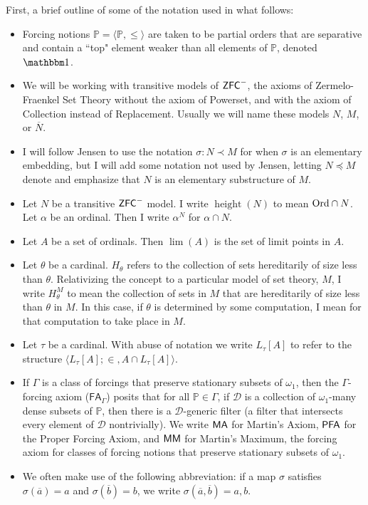 \documentclass{amsart}
\theoremstyle{definition}
\theoremstyle{remark}
\renewcommand{\P}{\mathbb{P}}
\newcommand{\N}{{\overline{N}}}
\newcommand{\PFA}{\textup{\ensuremath{\textsf{PFA}}}}
\newcommand{\MA}{\textup{\ensuremath{\textsf{MA}}}}
\newcommand{\MM}{\textup{\ensuremath{\textsf{MM}}}}
\newcommand{\ZFC}{\textup{\ensuremath{\textsf{ZFC}}}}
\newcommand{\Ord}{\textup{\ensuremath{\text{Ord}}}}
\DeclareMathOperator{\height}{height}
\begin{document}
First, a brief outline of some of the notation used in what follows:
\begin{itemize}
	\item Forcing notions $\P = \langle \P, \leq \rangle$ are taken to be partial orders that are separative and contain a ``top" element weaker than all elements of $\P$, denoted $\mathbbm 1$.
	
	\item We will be working with transitive models of $\ZFC^-$, the axioms of Zermelo-Fraenkel Set Theory without the axiom of \textsf{Powerset}, and with the axiom of \textsf{Collection} instead of \textsf{Replacement}. Usually we will name these models $N$, $M$, or $\N$. %

	\item I will follow Jensen to use the notation $\sigma: N \prec M$ for when $\sigma$ is an elementary embedding, but I will add some notation not used by Jensen, letting $N \preccurlyeq M$ denote and emphasize that $N$ is an elementary substructure of $M$. 

	\item Let $N$ be a transitive $\ZFC^-$ model. I write $\height(N)$ to mean $\Ord \cap N$. Let $\alpha$ be an ordinal. Then I write $\alpha^N$ for $\alpha \cap N$.
	
	\item Let $A$ be a set of ordinals. Then $\lim(A)$ is the set of limit points in $A$.  

	\item Let $\theta$ be a cardinal. $H_\theta$ refers to the collection of sets hereditarily of size less than $\theta$. Relativizing the concept to a particular model of set theory, $M$, I write $H_\theta^M$ to mean the collection of sets in $M$ that are hereditarily of size less than $\theta$ in $M$. In this case, if $\theta$ is determined by some computation, I mean for that computation to take place in $M$.
	
	\item Let $\tau$ be a cardinal. With abuse of notation we write $L_\tau[A]$ to refer to the structure $\langle L_\tau[A]; \in, A \cap L_\tau[A] \rangle$. 
	
	\item If $\Gamma$ is a class of forcings that preserve stationary subsets of $\omega_1$, then the $\Gamma$-forcing axiom ($\textsf{FA}_\Gamma$) posits that for all $\P \in \Gamma$, if $\mathcal D$ is a collection of $\omega_1$-many dense subsets of $\P$, then there is a $\mathcal D$-generic filter (a filter that intersects every element of $\mathcal D$ nontrivially). We write $\MA$ for Martin's Axiom, $\PFA$ for the Proper Forcing Axiom, and $\MM$ for Martin's Maximum, the forcing axiom for classes of forcing notions that preserve stationary subsets of $\omega_1$.
	
	\item We often make use of the following abbreviation: if a map $\sigma$ satisfies $\sigma(\overline a)=a$ and $\sigma(\overline b)=b$, we write $\sigma(\overline a,\overline b)=a,b$.
\end{itemize}	
\end{document}

